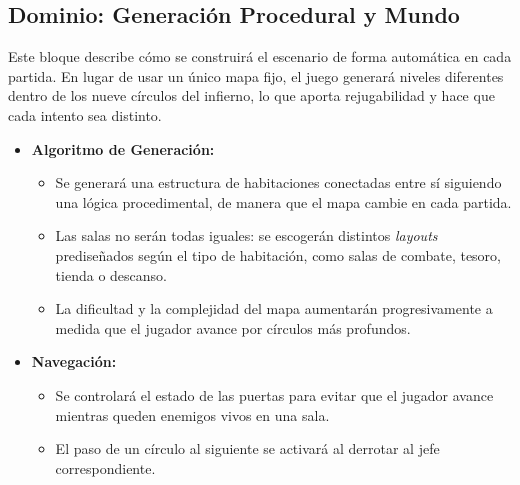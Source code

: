 \subsection{Dominio: Generación Procedural y Mundo}
Este bloque describe cómo se construirá el escenario de forma automática en cada partida. 
En lugar de usar un único mapa fijo, el juego generará niveles diferentes dentro de los 
nueve círculos del infierno, lo que aporta rejugabilidad y hace que cada intento sea distinto.
\begin{itemize}
    \item \textbf{Algoritmo de Generación:}
    \begin{itemize}
        \item Se generará una estructura de habitaciones conectadas entre sí siguiendo una 
        lógica procedimental, de manera que el mapa cambie en cada partida.
        \item Las salas no serán todas iguales: se escogerán distintos \textit{layouts} 
        prediseñados según el tipo de habitación, como salas de combate, tesoro, tienda o descanso.
        \item La dificultad y la complejidad del mapa aumentarán progresivamente a medida que 
        el jugador avance por círculos más profundos.
    \end{itemize}
    \item \textbf{Navegación:}
    \begin{itemize}
        \item Se controlará el estado de las puertas para evitar que el jugador avance mientras 
        queden enemigos vivos en una sala.
        \item El paso de un círculo al siguiente se activará al derrotar al jefe correspondiente.
    \end{itemize}
\end{itemize}

